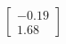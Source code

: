 \documentclass[preview]{standalone}
\begin{document}
\begin{align*}
\begin{bmatrix} -0.19 \\ 1.68 \end{bmatrix}
\end{align*}
\end{document}
